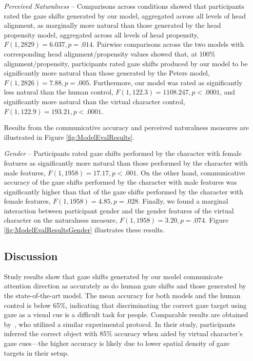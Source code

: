 \emph{Perceived Naturalness} -- Comparisons across conditions showed that participants rated the gaze shifts generated by our model, aggregated across all levels of head alignment, as marginally more natural than those generated by the head propensity model, aggregated across all levels of head propensity, $F(1, 2829) = 6.037, p = .014$. Pairwise comparisons across the two models with corresponding head alignment/propensity values showed that, at 100\% alignment/propensity, participants rated gaze shifts produced by our model to be significantly more natural than those generated by the Peters model, $F(1, 2826) = 7.88, p = .005$. Furthermore, our model was rated as significantly less natural than the human control, $F(1, 122.3) = 1108.247, p < .0001$, and significantly more natural than the virtual character control, $F(1, 122.9) = 193.21, p < .0001$.

Results from the communicative accuracy and perceived naturalness measures are illustrated in Figure \ref{fig:ModelEvalResults}.

\emph{Gender} -- Participants rated gaze shifts performed by the character with female features as significantly more natural than those performed by the character with male features, $F(1, 1958) = 17.17, p < .001$. On the other hand, communicative accuracy of the gaze shifts performed by the character with male features was significantly higher than that of the gaze shifts performed by the character with female features, $F(1, 1958) = 4.85, p = .028$. Finally, we found a marginal interaction between participant gender and the gender features of the virtual character on the naturalness measure, $F(1, 1958) = 3.20, p = .074$. Figure \ref{fig:ModelEvalResultsGender} illustrates these results.

\subsection{Discussion}

Study results show that gaze shifts generated by our model communicate attention direction as accurately as do human gaze shifts and those generated by the state-of-the-art model. The mean accuracy for both models and the human control is below 65\%, indicating that discriminating the correct gaze target using gaze as a visual cue is a difficult task for people. Comparable results are obtained by~\citet{bailly2010gaze}, who utilized a similar experimental protocol. In their study, participants inferred the correct object with 85\% accuracy when aided by virtual character's gaze cues---the higher accuracy is likely due to lower spatial density of gaze targets in their setup.

